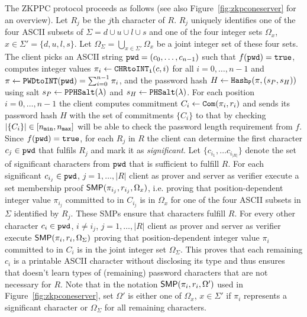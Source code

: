 The \ac{ZKPPC} protocol proceeds as follows (see also Figure~\ref{fig:zkpconeserver} for an overview). Let $R_j$ be the $j$th character of $R$. $R_j$ uniquely identifies one of the four \ac{ASCII} subsets of $\Sigma = d \cup u \cup l \cup s$ and one of the four integer sets $\Omega_x$, $x\in\Sigma'=\{d, u, l, s\}$. Let $\Omega_\Sigma=\bigcup_{x\in\Sigma'}\Omega_x$ be a joint integer set of these four sets. The client picks an \ac{ASCII} string $\mathtt{pwd}=(c_0,\ldots,c_{n-1})$ such that $f(\mathtt{pwd})=\mathtt{true}$, computes integer values $\pi_i\gets\texttt{CHRtoINT}_\texttt{i}(c, i)$ for all $i= 0,\ldots, n-1$ and $\pi \gets \texttt{PWDtoINT}(\mathtt{pwd}) = \sum_{i=0}^{n-1}\pi_i$, and the password hash $H\gets \mathtt{Hash_P}(\pi, (s_P, s_H))$ using salt $s_P\gets\mathtt{PPHSalt}(\lambda)$ and $s_H\gets\mathtt{PHSalt}(\lambda)$. For each position $i=0,\ldots,n-1$ the client computes commitment $C_i \gets \mathtt{Com}(\pi_i, r_i)$ and sends its password hash $H$ with the set of commitments $\{C_i\}$ to \Server that by checking $|\{C_i\}|\in[{n_\mathtt{min}},{n_\mathtt{max}}]$ will be able to check the password length requirement from $f$. Since $f(\mathtt{pwd})=\mathtt{true}$, for each $R_j$ in $R$ the client can determine the first character $c_j\in\mathtt{pwd}$ that fulfils $R_j$ and mark it as \emph{significant}. Let $\{c_{i_1},\ldots c_{i_{|R|}}\}$ denote the set of significant characters from $\mathtt{pwd}$ that is sufficient to fulfill $R$. For each significant $c_{i_j}\in\mathtt{pwd}$, $j=1,\ldots, |R|$ client \Client as prover and server \Server as verifier execute a set membership proof $\mathsf{SMP}(\pi_{i_j},r_{i_j},\Omega_x)$, i.e. proving that position-dependent integer value $\pi_{i_j}$ committed to in $C_{i_j}$ is in $\Omega_x$ for one of the four \ac{ASCII} subsets in $\Sigma$ identified by $R_j$. These SMPs ensure that characters fulfill $R$. For every other character $c_i\in\mathtt{pwd}$, $i\neq i_j$, $j=1,\ldots, |R|$ client \Client as prover and server \Server as verifier execute $\mathsf{SMP}(\pi_{i},r_{i},\Omega_\Sigma)$ proving that position-dependent integer value $\pi_{i}$ committed to in $C_{i}$ is in the joint integer set $\Omega_{\Sigma}$. This proves that each remaining $c_i$ is a printable \ac{ASCII} character without disclosing its type and thus ensures that \Server doesn't learn types of (remaining) password characters that are not necessary for $R$. Note that in the notation $\mathsf{SMP}(\pi_i,r_i,\Omega')$ used in Figure~\ref{fig:zkpconeserver}, set $\Omega'$ is either one of $\Omega_x$, $x\in\Sigma'$ if $\pi_i$ represents a significant character or $\Omega_\Sigma$ for all remaining characters.

